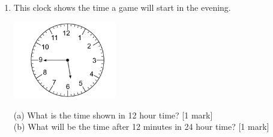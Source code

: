 \documentclass{article}
\begin{document}
\begin{enumerate}
\hline
\vspace{5pt}

\\


\item \quad This clock shows the time a game will start in the evening.
\begin{center}
    \includegraphics[width=4.5cm]{Year_6_Mixed_Tests/Clock2.png}
\end{center}
\begin{flushleft}
(a) What is the time shown in 12 hour time? \hspace{2cm} [1 mark] \\
\vspace{20pt}
(b) What will be the time after 12 minutes in 24 hour time? \hspace{2cm} [1 mark]
\vspace{20pt}
\end{flushleft}

 

\end{enumerate}
\end{document}
